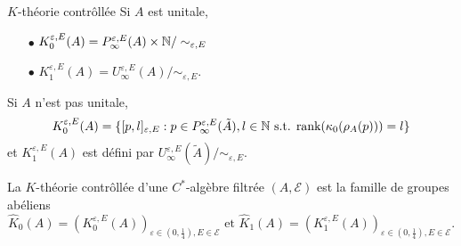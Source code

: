 \begin{frame}{$K$-théorie contrôllée}
Si $A$ est unitale,
\begin{itemize}
\item[$\bullet$] $K_0^{\varepsilon,E}(A) = P^{\varepsilon, E}_\infty(A)\times \mathbb N / \sim_{\varepsilon,E}$ 
\item[$\bullet$] $K_1^{\varepsilon,E}(A) = U^{\varepsilon, E}_\infty(A) / \sim_{\varepsilon,E}$.
\end{itemize}

Si $A$ n'est pas unitale,  
\[K_0^{\varepsilon,E}(A) = \{[p,l]_{\varepsilon,E} : p\in P^{\varepsilon,E}_\infty (\tilde A), l\in \mathbb N \text{ s.t. rank}(\kappa_0(\rho_A(p)))=l \}\]
et $K_1^{\varepsilon,E}(A)$ est défini par $U_\infty^{\varepsilon,E}(\tilde A)/ \sim_{\varepsilon,E}$.\\

\begin{definitionfr}
La $K$-théorie contrôllée d'une $C^*$-algèbre filtrée $(A,\mathcal E)$ est la famille de groupes abéliens 
\[\hat K_0(A) = (K_0^{\varepsilon,E}(A))_{\varepsilon\in (0,\frac{1}{4}),E\in\mathcal E} \text{ et } \hat K_1(A) = (K_1^{\varepsilon,E}(A))_{\varepsilon\in (0,\frac{1}{4}),E\in\mathcal E}.\]
\end{definitionfr}
\end{frame}













































